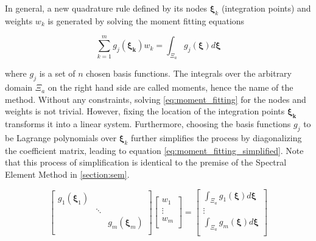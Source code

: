 In general, a new quadrature rule defined by its nodes $\boldsymbol{\xi}_k$ (integration points) and weights $w_k$ is generated by solving the moment fitting equations

\begin{equation} \label{eq:moment_fitting}
		\sum_{k=1}^m g_j(\boldsymbol{\xi_k}) w_k = \int_{\Xi_a} g_j(\boldsymbol{\xi}) d\boldsymbol{\xi}
\end{equation}

where $g_j$ is a set of $n$ chosen basis functions. The integrals over the arbitrary domain $\Xi_a$ on the right hand side are called moments, hence the name of the method. Without any constraints, solving \ref{eq:moment_fitting} for the nodes and weights is not trivial. However, fixing the location of the integration points $\boldsymbol{\xi_k}$ transforms it into a linear system. Furthermore, choosing the basis functions $g_j$ to be Lagrange polynomials over $\boldsymbol{\xi}_k$ further simplifies the process by diagonalizing the coefficient matrix, leading to equation \ref{eq:moment_fitting_simplified}. Note that this process of simplification is identical to the premise of the Spectral Element Method in \ref{section:sem}.

\begin{equation} \label{eq:moment_fitting_simplified}
	\begin{bmatrix}
		g_1(\boldsymbol{\xi}_1) & & \\
		& \ddots & \\
		& & g_m(\boldsymbol{\xi}_m) \\
	\end{bmatrix}
	\begin{bmatrix}
		w_1 \\
		\vdots \\
		w_m \\
	\end{bmatrix}
	=
	\begin{bmatrix}
		\int_{\Xi_a} g_1(\boldsymbol{\xi}) d\boldsymbol{\xi} \\
		\vdots \\
		\int_{\Xi_a} g_m(\boldsymbol{\xi}) d\boldsymbol{\xi} \\
	\end{bmatrix}
\end{equation}

